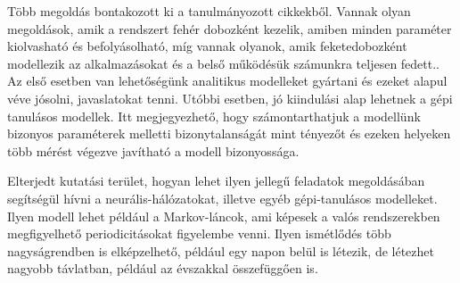 Több megoldás bontakozott ki a tanulmányozott cikkekből. Vannak olyan megoldások, amik a rendszert fehér dobozként kezelik, amiben minden paraméter kiolvasható és befolyásolható, míg vannak olyanok, amik feketedobozként modellezik az alkalmazásokat és a belső működésük számunkra teljesen fedett.\citep{TowardsAnAdaptive}. Az első esetben van lehetőségünk analitikus modelleket gyártani és ezeket alapul véve jósolni, javaslatokat tenni. Utóbbi esetben, jó kiindulási alap lehetnek a gépi tanulásos modellek. Itt megjegyezhető, hogy számontarthatjuk a modellünk bizonyos paraméterek melletti bizonytalanságát mint tényezőt és ezeken helyeken több mérést végezve javítható a modell bizonyossága\citep{TowardsAnAdaptive}.

Elterjedt kutatási terület, hogyan lehet ilyen jellegű feladatok megoldásában segítségül hívni a neurális-hálózatokat, illetve egyéb gépi-tanulásos modelleket. Ilyen modell lehet például a Markov-láncok, ami képesek a valós rendszerekben megfigyelhető periodicitásokat figyelembe venni\citep{CloudScale}. Ilyen ismétlődés több nagyságrendben is elképzelhető, például egy napon belül is létezik, de létezhet nagyobb távlatban, például az évszakkal összefüggően is\citep{PredictingUsageAndProactiveScaling}.




